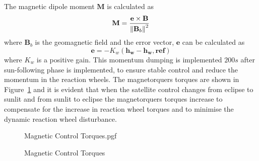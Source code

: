 The magnetic dipole moment $\mathbf{M}$ is calculated as 
\begin{equation}
\mathbf{M} = \frac{\mathbf{e} \times \mathbf{B}}{\left\lVert\mathbf{B}_b\right\rVert^2}
\end{equation}
where $\mathbf{B}_b$ is the geomagnetic field and the error vector, $\mathbf{e}$ can be calculated as
\begin{equation}
\mathbf{e} = -K_w(\mathbf{h_w} - \mathbf{h_w,ref})
\end{equation}
where $K_w$ is a positive gain. This momentum dumping is implemented $200s$ after sun-following phase is implemented, to ensure stable control and reduce the momentum in the reaction wheels. The magnetorquers torques are shown in Figure~\ref{fig:Magnetic Control Torques} and it is evident that when the satellite control changes from eclipse to sunlit and from sunlit to eclipse the magnetorquers torques increase to compensate for the increase in reaction wheel torques and to minimise the dynamic reaction wheel disturbance.

\begin{figure}[!htb]
	\centering
	\def\pgfwidth{10cm}
	{Magnetic Control Torques.pgf}
	
	\caption{Magnetic Control Torques}
	\label{fig:Magnetic Control Torques}
\end{figure}


%
%	
%	
%	
%	
%	
%	
%	


